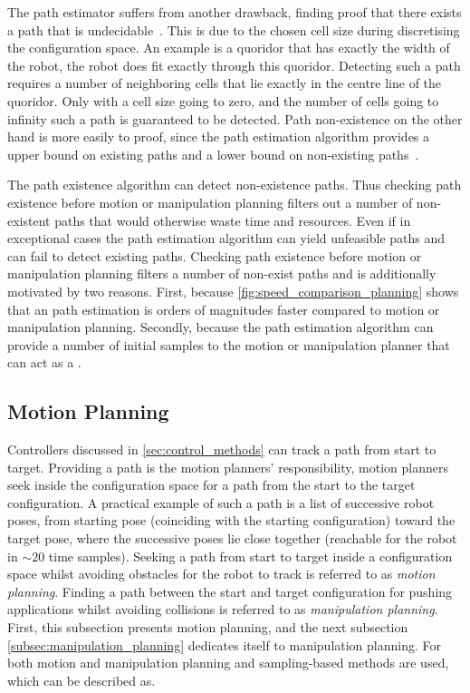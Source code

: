 The path estimator suffers from another drawback, finding proof that there exists a path that is undecidable~\cite{zhang_simple_2008}. This is due to the chosen cell size during discretising the configuration space. An example is a quoridor that has exactly the width of the robot, the robot does fit exactly through this quoridor. Detecting such a path requires a number of neighboring cells that lie exactly in the centre line of the quoridor. Only with a cell size going to zero, and the number of cells going to infinity such a path is guaranteed to be detected. Path non-existence on the other hand is more easily to proof, since the path estimation algorithm provides a upper bound on existing paths and a lower bound on non-existing paths~\cite{zhang_simple_2008}.\bs

The path existence algorithm can detect non-existence paths. Thus checking path existence before motion or manipulation planning filters out a number of non-existent paths that would otherwise waste time and resources. Even if in exceptional cases the path estimation algorithm can yield unfeasible paths and can fail to detect existing paths. Checking path existence before motion or manipulation planning filters a number of non-exist paths and is additionally motivated by two reasons. First, because \cref{fig:speed_comparison_planning} shows that an path estimation is orders of magnitudes faster compared to motion or manipulation planning. Secondly, because the path estimation algorithm can provide a number of initial samples to the motion or manipulation planner that can act as a .

\subsection{Motion Planning}%
\label{subsec:motion_planning}
Controllers discussed in \cref{sec:control_methods} can track a path from start to target. Providing a path is the motion planners' responsibility, motion planners seek inside the configuration space for a path from the start to the target configuration. A practical example of such a path is a list of successive robot poses, from starting pose (coinciding with the starting configuration) toward the target pose, where the successive poses lie close together 
(reachable for the robot in $\sim20$ time samples). Seeking a path from start to target inside a configuration space whilst avoiding obstacles for the robot to track is referred to as \textit{motion planning}. Finding a path between the start and target configuration for pushing applications whilst avoiding collisions is referred to as \textit{manipulation planning}. First, this subsection presents motion planning, and the next subsection \cref{subsec:manipulation_planning} dedicates itself to manipulation planning. For both motion and manipulation planning and sampling-based methods are used, which can be described as.\bs

